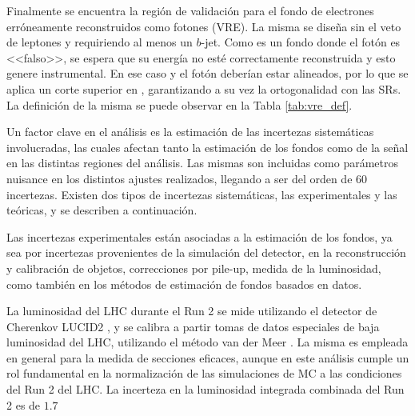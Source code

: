 Finalmente se encuentra la región de validación para el fondo de electrones erróneamente reconstruidos como fotones (VRE). La misma se diseña sin el veto de leptones y requiriendo al menos un $b$-jet. Como es un fondo donde el fotón es <<falso>>, se espera que su energía no esté correctamente reconstruida y esto genere \met instrumental. En ese caso \met y el fotón deberían estar alineados, por lo que se aplica un corte superior en \dphigammet, garantizando a su vez la ortogonalidad con las SRs. La definición de la misma se puede observar en la Tabla \ref{tab:vre_def}.


Un factor clave en el análisis es la estimación de las incertezas sistemáticas involucradas, las cuales afectan tanto la estimación de los fondos como de la señal en las distintas regiones del análisis. Las mismas son incluidas como parámetros nuisance en los distintos ajustes realizados, llegando a ser del orden de 60 incertezas. Existen dos tipos de incertezas sistemáticas, las experimentales y las teóricas, y se describen a continuación.


Las incertezas experimentales están asociadas a la estimación de los fondos, ya sea por incertezas provenientes de la simulación del detector, en la reconstrucción y calibración de objetos, correcciones por pile-up, medida de la luminosidad, como también en los métodos de estimación de fondos basados en datos.



La luminosidad del LHC durante el Run 2 se mide utilizando el detector de Cherenkov LUCID2 \cite{Avoni:2018iuv}, y se calibra a partir tomas de datos especiales de baja luminosidad del LHC, utilizando el método van der Meer \cite{vanderMeer:296752,Grafstrom:2153734}. La misma es empleada en general para la medida de secciones eficaces, aunque en este análisis cumple un rol fundamental en la normalización de las simulaciones de MC a las condiciones del Run 2 del LHC. La incerteza en la luminosidad integrada combinada del Run 2 es de $1.7$



